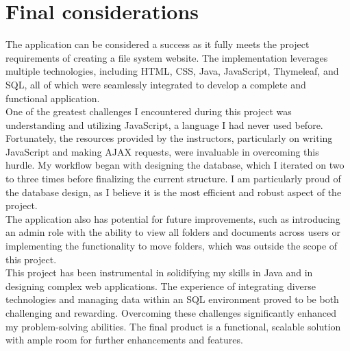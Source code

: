 \documentclass[a4paper,12pt]{article}
\begin{document}
\section{Final considerations}
The application can be considered a success as it fully meets the project requirements of creating a file system website. The implementation leverages multiple technologies, including HTML, CSS, Java, JavaScript, Thymeleaf, and SQL, all of which were seamlessly integrated to develop a complete and functional application.\\
One of the greatest challenges I encountered during this project was understanding and utilizing JavaScript, a language I had never used before. Fortunately, the resources provided by the instructors, particularly on writing JavaScript and making AJAX requests, were invaluable in overcoming this hurdle.
My workflow began with designing the database, which I iterated on two to three times before finalizing the current structure. I am particularly proud of the database design, as I believe it is the most efficient and robust aspect of the project.\\
The application also has potential for future improvements, such as introducing an admin role with the ability to view all folders and documents across users or implementing the functionality to move folders, which was outside the scope of this project.\\
This project has been instrumental in solidifying my skills in Java and in designing complex web applications. The experience of integrating diverse technologies and managing data within an SQL environment proved to be both challenging and rewarding. Overcoming these challenges significantly enhanced my problem-solving abilities. The final product is a functional, scalable solution with ample room for further enhancements and features.
        
\end{document}
